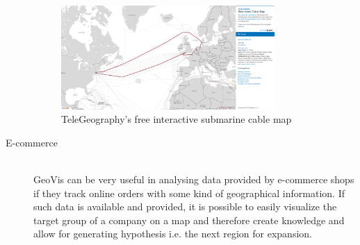 \begin{description}
\begin{figure}[h]
\centering
\includegraphics[width=0.8\textwidth,keepaspectratio]{images/geovis/submarine-interactive.png}
\caption[
    TeleGeography’s free interactive submarine cable map, Urldate: 07.2016 \newline
\small\texttt{\url{http://www.submarinecablemap.com/}}
]{TeleGeography’s free interactive submarine cable map}
\label{fig:submarine-interactive}
\end{figure}

\item[E-commerce] \hfill \\
\ac{GeoVis} can be very useful in analysing data provided by e-commerce shops if they track online orders with some kind of geographical information. If such data is available and provided, it is possible to easily visualize the target group of a company on a map and therefore  create knowledge and allow for generating hypothesis i.e. the next region for expansion.

\end{description}